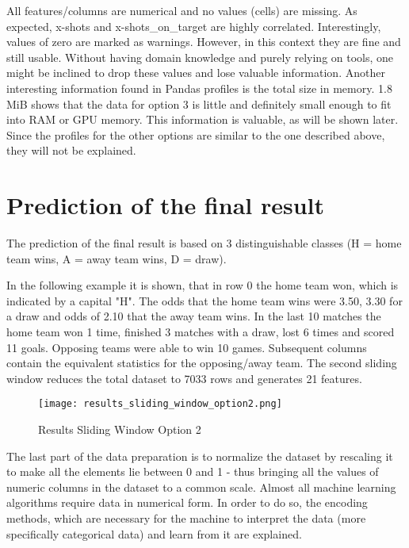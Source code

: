 All features/columns are numerical and no values (cells) are missing. As expected, x-shots and x-shots\_on\_target are highly 
correlated. Interestingly, values of zero are marked as warnings. However, in this context they are fine and still usable. Without having domain knowledge and purely relying on tools, one might be inclined to drop these values and lose valuable information. Another interesting information found in Pandas profiles is the total size in memory. 1.8 MiB shows that the data for option 3 is little and definitely small enough to fit into RAM or GPU memory. This information is valuable, as will be shown later.
\newline
Since the profiles for the other options are similar to the one described above, they will not be explained.


\section {Prediction of the final result}

The prediction of the final result is based on 3 distinguishable classes (H = home team wins, A = away team wins, D = draw).

In the following example it is shown, that in row 0 the home team won, which is indicated by a capital "H". The odds that the home team wins were 3.50, 3.30 for a draw and odds of 2.10 that the away team wins. In the last 10 matches the home team won 1 time, finished 3 matches with a draw, lost 6 times and scored 11 goals. Opposing teams were able to win 10 games. Subsequent columns contain the equivalent statistics for the opposing/away team. The second sliding window reduces the total dataset to 7033 rows and generates 21 features.


\begin{figure}[H]
\begin{center}
\texttt{[image: results\_sliding\_window\_option2.png]}
\end{center}
\caption{Results Sliding Window Option 2}
\label{fig:results_sliding_window_option2}
\end{figure}

The last part of the data preparation is to normalize the dataset by rescaling it to make all the elements lie between 0 and 1 - thus bringing all the values of numeric columns in the dataset to a common scale. Almost all machine learning algorithms require data in numerical form. In order to do so, the encoding methods, which are necessary for the machine to interpret the data (more specifically categorical data) and learn from it are explained.

